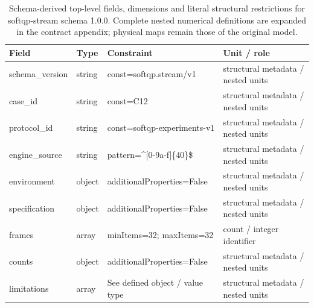 \begin{table}[htbp]\centering\footnotesize
\caption{Schema-derived top-level fields, dimensions and literal structural restrictions for softqp-stream schema 1.0.0. Complete nested numerical definitions are expanded in the contract appendix; physical maps remain those of the original model.}\label{tab:contract-softqp-stream}
\begin{tabularx}{\textwidth}{@{}>{\raggedright\arraybackslash}p{}>{\raggedright\arraybackslash}p{}>{\raggedright\arraybackslash}X>{\raggedright\arraybackslash}X@{}}\toprule
Field & Type & Constraint & Unit / role\\\midrule
schema\_\allowbreak{}version & string & const=\allowbreak{}softqp.\allowbreak{}stream/\allowbreak{}v1 & structural metadata /\allowbreak{} nested units\\
case\_\allowbreak{}id & string & const=\allowbreak{}C12 & structural metadata /\allowbreak{} nested units\\
protocol\_\allowbreak{}id & string & const=\allowbreak{}softqp-\allowbreak{}experiments-\allowbreak{}v1 & structural metadata /\allowbreak{} nested units\\
engine\_\allowbreak{}source & string & pattern=\allowbreak{}\textasciicircum{}[0-9a-\allowbreak{}f]\{40\}\$ & structural metadata /\allowbreak{} nested units\\
environment & object & additionalProperties=\allowbreak{}False & structural metadata /\allowbreak{} nested units\\
specification & object & additionalProperties=\allowbreak{}False & structural metadata /\allowbreak{} nested units\\
frames & array & minItems=\allowbreak{}32; maxItems=\allowbreak{}32 & count /\allowbreak{} integer identifier\\
counts & object & additionalProperties=\allowbreak{}False & structural metadata /\allowbreak{} nested units\\
limitations & array & See defined object /\allowbreak{} value type & structural metadata /\allowbreak{} nested units\\
\bottomrule\end{tabularx}
\end{table}
